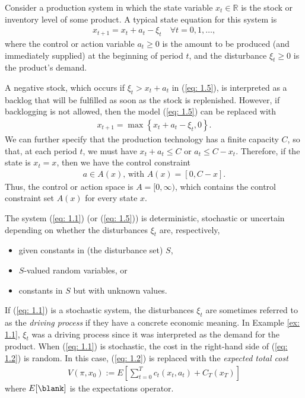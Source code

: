\documentclass[\topdir/lecture\_notes.tex]{subfiles}
\begin{document}
\begin{example} \label{ex: 1.1} 
Consider a production system in which the state variable $x_{t} \in \mathbb{R}$ is the stock or inventory level of some product. A typical state equation for this system is
\begin{align}
x_{t+1}=x_{t}+a_{t}-\xi_{t} \quad \forall t=0,1, \ldots, \label{eq: 1.5}
\end{align}
where the control or action variable $a_{t} \geq 0$ is the amount to be  produced (and immediately supplied) at the beginning of period $t$, and the disturbance $\xi_{t} \geq 0$ is the product's demand.

A negative stock, which occurs if $\xi_{t}>x_{t}+a_{t}$ in (\ref{eq: 1.5}), is interpreted as a backlog that will be fulfilled as soon as the stock is replenished. However, if backlogging is not allowed, then the model (\ref{eq: 1.5}) can be replaced with
\begin{align*}
x_{t+1}=\max \left\{x_{t}+a_{t}-\xi_{t}, 0\right\}.
\end{align*}
We can further specify that the production technology has a finite capacity $C$, so that, at each period $t$, we must have $x_{t}+a_{t} \leq C$ or $a_{t} \leq C-x_{t}$. Therefore, if the state is $x_{t}=x$, then we have the control constraint
\begin{align*}
a \in A(x) \text {, with } A(x)=[0, C-x].
\end{align*}
Thus, the control or action space is $A=[0, \infty)$, which contains the control constraint set $A(x)$ for every state $x$.
\end{example}

The system (\ref{eq: 1.1}) (or (\ref{eq: 1.5})) is deterministic, stochastic or uncertain depending on whether the disturbances $\xi_{t}$ are, respectively,
\begin{itemize}
  \item given constants in (the disturbance set) $S$,
  \item $S$-valued random variables, or
  \item constants in $S$ but with unknown values.
\end{itemize}

If (\ref{eq: 1.1}) is a stochastic system, the disturbances $\xi_{t}$ are sometimes referred to as the \emph{driving process} if they have a concrete economic meaning. In Example \ref{ex: 1.1}, $\xi_{t}$ was a driving process since it was interpreted as the demand for the product. When (\ref{eq: 1.1}) is stochastic, the cost in the right-hand side of (\ref{eq: 1.2}) is random. In this case, (\ref{eq: 1.2}) is replaced with the \emph{expected total cost}
\begin{align}
    V(\pi, x_{0}):=E\left[\sum_{t=0}^{T} c_{t}(x_{t}, a_{t})+C_{T}(x_{T})\right] \label{eq: 1.6}
\end{align}
where $E[\blank]$ is the expectations operator.
\end{document}
